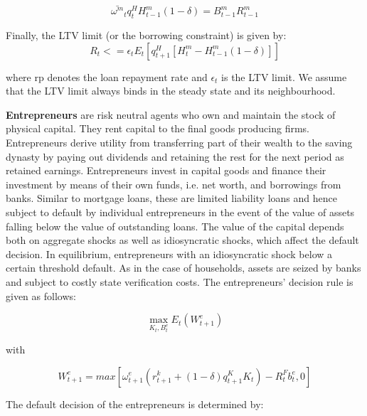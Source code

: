 \documentclass[12pt]{article}
\numberwithin{equation}{section}
\begin{document}
\begin{equation}
\bar{\omega^m}_t q^H_{t} H^m_{t-1}(1-\delta) = B^m_{t-1}R^m_{t-1}
\end{equation}


Finally, the LTV limit (or the borrowing constraint) is given by:
\begin{equation}
[B^m_{t}-(1-rp)B^m_{t-1}]R_{t} <=\epsilon_{t} E_t[q^H_{t+1} [H^m_t-H^m_{t-1}(1-\delta)]]
\end{equation}

where rp denotes the loan repayment rate and $\epsilon_{t}$ is the LTV limit. We assume that the LTV limit always binds in the steady state and its neighbourhood.


\noindent
\textbf{Entrepreneurs } are risk neutral agents who own and maintain the stock of physical capital. They rent  capital to the final goods producing firms. Entrepreneurs derive utility from transferring part of their wealth to the saving dynasty by paying out dividends and retaining the rest for the next period as retained earnings. Entrepreneurs invest in capital goods and finance their investment by means of their own funds, i.e. net worth, and borrowings from banks. Similar to mortgage loans, these are limited liability loans and hence subject to default by individual entrepreneurs in the event of the value of assets falling below the value of outstanding loans. The value of the capital depends both on aggregate shocks as well as idiosyncratic shocks, which affect the default decision. In equilibrium, entrepreneurs with an idiosyncratic shock below a certain threshold default.  As in the case of households, assets are seized by banks and subject to costly state verification costs. The entrepreneurs' decision rule is given as follows: 

\begin{equation}
\max_{K_t,B^e_t}E_t(W^e_{t+1})
\end{equation}	

with

\begin{equation}
W^e_{t+1}=max[\omega^e_{t+1}(r^k_{t+1}+(1-\delta)q^K_{t+1}K_{t})-R^F_{t}b^e_{t},0]
\end{equation}


The default decision of the entrepreneurs is determined by: 
\end{document}
